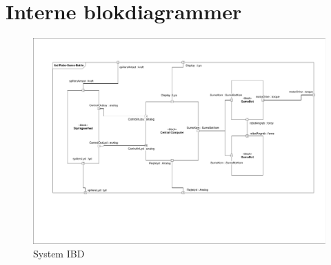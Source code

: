 \section{Interne blokdiagrammer}
\begin{figure}
	\centering
   	\includegraphics[page=1,width=1\linewidth]{figs/Diagrammer/IBD.pdf}
	\caption{System IBD}
	\label{fig:IBD_System}
\end{figure}

